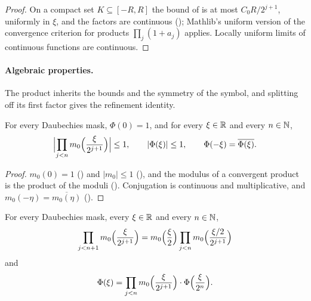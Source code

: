 \begin{proof}
\leanok
{}
On a compact set $K \subseteq [-R, R]$ the bound of  is at
most $C_0 R/2^{j+1}$, uniformly in $\xi$, and the factors are continuous
(); Mathlib's uniform version of the convergence criterion for
products $\prod_j (1 + a_j)$ applies. Locally uniform limits of continuous functions are
continuous.
\end{proof}

\paragraph{Algebraic properties.}
The product inherits the bounds and the symmetry of the symbol, and splitting off its first
factor gives the refinement identity.

\begin{proposition}
\label{prop:daub-symbol-product-basic}
\leanok
{}
For every Daubechies mask, $\Phi(0) = 1$, and for every $\xi \in \mathbb{R}$ and every $n \in \mathbb{N}$,
\[
  \Bigl|\prod_{j<n} m_0\Bigl(\frac{\xi}{2^{j+1}}\Bigr)\Bigr| \leq 1 , \qquad
  |\Phi(\xi)| \leq 1 , \qquad \Phi(-\xi) = \overline{\Phi(\xi)} .
\]
\end{proposition}

\begin{proof}
\leanok
{}
$m_0(0) = 1$ () and $|m_0| \leq 1$ (), and the
modulus of a convergent product is the product of the moduli
(). Conjugation is continuous and multiplicative, and
$m_0(-\eta) = \overline{m_0(\eta)}$ ().
\end{proof}

\begin{lemma}
\label{lem:daub-symbol-product-split}
\leanok
{}
For every Daubechies mask, every $\xi \in \mathbb{R}$ and every $n \in \mathbb{N}$,
\[
  \prod_{j<n+1} m_0\Bigl(\frac{\xi}{2^{j+1}}\Bigr)
  = m_0\Bigl(\frac{\xi}{2}\Bigr) \prod_{j<n} m_0\Bigl(\frac{\xi/2}{2^{j+1}}\Bigr)
\]
and
\[
  \Phi(\xi) = \prod_{j<n} m_0\Bigl(\frac{\xi}{2^{j+1}}\Bigr) \cdot \Phi\Bigl(\frac{\xi}{2^n}\Bigr) .
\]
\end{lemma}

